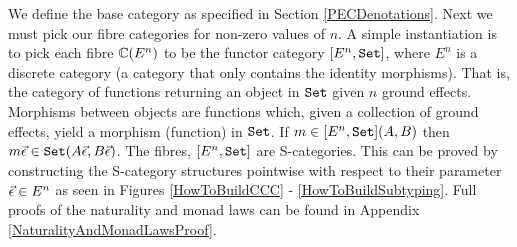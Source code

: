 We define the base category as specified in Section \ref{PECDenotations}. Next we must pick our fibre categories for non-zero values of $n$. A simple instantiation is to pick each fibre $\mathbb{C}(E^n)$ to be the functor category $[E^n, \texttt{Set}]$,  where $E^n$ is a discrete category (a category that only contains the identity morphisms). That is, the category of functions returning an object in $\texttt{Set}$ given $n$ ground effects. Morphisms between objects are functions which, given a collection of ground effects, yield a morphism (function) in $\texttt{Set}$. If $m\in [E^n, \texttt{Set}](A, B)$ then $m\vec{\epsilon}\in\texttt{Set}(A\vec{\epsilon}, B\vec{\epsilon})$. The fibres, $[E^n, \texttt{Set}]$ are S-categories. This can be proved by constructing the S-category structures pointwise with respect to their parameter $\vec{\epsilon} \in E^n$ as seen in Figures \ref{HowToBuildCCC} - \ref{HowToBuildSubtyping}. Full proofs of the naturality and monad laws can be found in Appendix \ref{NaturalityAndMonadLawsProof}.



